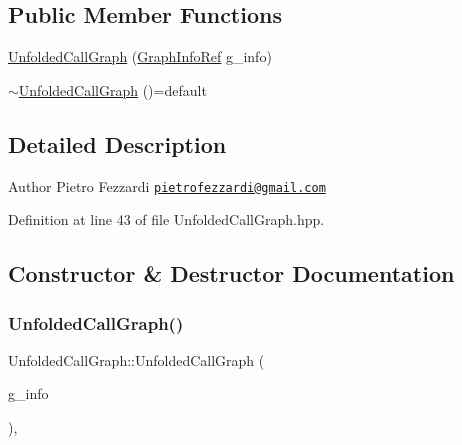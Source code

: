 \subsection*{Public Member Functions}
\begin{DoxyCompactItemize}
\item 
\hyperlink{classUnfoldedCallGraph_a20bf436ff102966d0ec593f24834aeef}{Unfolded\+Call\+Graph} (\hyperlink{graph__info_8hpp_a4a5c364c379e5139b7dc97e7e69c7da3}{Graph\+Info\+Ref} g\+\_\+info)
\item 
\hyperlink{classUnfoldedCallGraph_a072951a37bb5d49a26e2b9a32a1bcec3}{$\sim$\+Unfolded\+Call\+Graph} ()=default
\end{DoxyCompactItemize}


\subsection{Detailed Description}
\begin{DoxyAuthor}{Author}
Pietro Fezzardi \href{mailto:pietrofezzardi@gmail.com}{\tt pietrofezzardi@gmail.\+com} 
\end{DoxyAuthor}


Definition at line 43 of file Unfolded\+Call\+Graph.\+hpp.



\subsection{Constructor \& Destructor Documentation}
\mbox{\label{classUnfoldedCallGraph_a20bf436ff102966d0ec593f24834aeef}} 
\subsubsection{\texorpdfstring{Unfolded\+Call\+Graph()}{UnfoldedCallGraph()}}
{\footnotesize\ttfamily Unfolded\+Call\+Graph\+::\+Unfolded\+Call\+Graph (\begin{DoxyParamCaption}\item[{\hyperlink{graph__info_8hpp_a4a5c364c379e5139b7dc97e7e69c7da3}{Graph\+Info\+Ref}}]{g\+\_\+info }\end{DoxyParamCaption})\hspace{0.3cm}{\ttfamily [inline]}, {\ttfamily [explicit]}}




